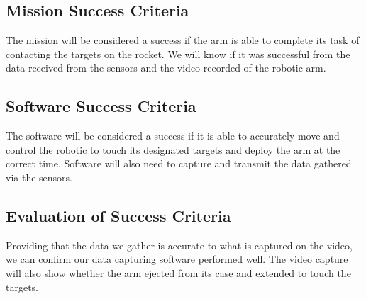\documentclass[letterpaper,10pt]{article}
\begin{document}
\subsection{Mission Success Criteria}
The mission will be considered a success if the arm is able to complete its task of contacting the targets on the rocket. We will know if it was successful from the data received from the sensors and the video recorded of the robotic arm.
\subsection{Software Success Criteria}
The software will be considered a success if it is able to accurately move and control the robotic to touch its designated targets and deploy the arm at the correct time. Software will also need to capture and transmit the data gathered via the sensors.  
\subsection{Evaluation of Success Criteria}
Providing that the data we gather is accurate to what is captured on the video, we can confirm our data capturing software performed well. The video capture will also show whether the arm ejected from its case and extended to touch the targets.
\end{document}
